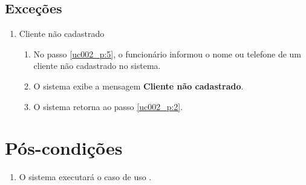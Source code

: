 \subsection{Exceções}

\begin{enumerate}[label=E\arabic*]
	\item Cliente não cadastrado \label{uc002_e:1}
	\begin{enumerate}[label*=.\arabic*]
		\item[] No passo \ref{uc002_p:5}, o funcionário informou o nome ou telefone de um cliente não cadastrado no sistema.
		\item O sistema exibe a mensagem \textbf{Cliente não cadastrado}.
		\item O sistema retorna ao passo \ref{uc002_p:2}.
	\end{enumerate}
\end{enumerate}

\section{Pós-condições}

\begin{enumerate}
	\item O sistema executará o caso de uso .	
\end{enumerate}
